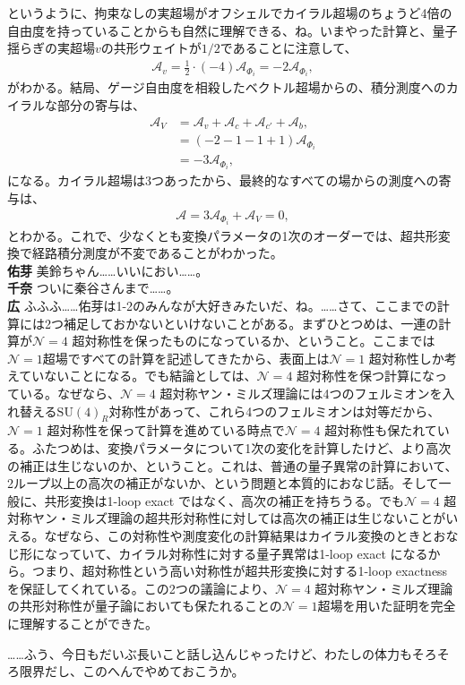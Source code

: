 \documentclass[paper=b5j,fontsize=12Q,jafontsize=12Q,baselineskip=21Q]{jlreq}
\DeclareRobustCommand{\hiron}{\textbf{広 }}
\DeclareRobustCommand{\chinan}{\textbf{千奈 }}
\DeclareRobustCommand{\umen}{\textbf{佑芽 }}
\begin{document}
\begin{refsection}
\begin{itemize}
\end{itemize}
というように、拘束なしの実超場がオフシェルでカイラル超場のちょうど4倍の自由度を持っていることからも自然に理解できる、ね。いまやった計算と、量子揺らぎの実超場$v$の共形ウェイトが$1/2$であることに注意して、
\begin{align}
  \mathcal A_v=\frac12\cdot(-4)\mathcal A_{\Phi_i}=-2\mathcal A_{\Phi_i},
\end{align}
がわかる。結局、ゲージ自由度を相殺したベクトル超場からの、積分測度へのカイラルな部分の寄与は、
\begin{align}
  \mathcal A_V&=\mathcal A_v+\mathcal A_c+\mathcal A_{c'}+\mathcal A_b,\\
  &=(-2-1-1+1)\mathcal A_{\Phi_i}\\
  &=-3\mathcal A_{\Phi_i},
\end{align}
になる。カイラル超場は3つあったから、最終的なすべての場からの測度への寄与は、
\begin{align}
  \mathcal A=3\mathcal A_{\Phi_i}+\mathcal A_V=0,
\end{align}
とわかる。これで、少なくとも変換パラメータの1次のオーダーでは、超共形変換で経路積分測度が不変であることがわかった。
\\\umen 美鈴ちゃん……いいにおい……。
\\\chinan ついに秦谷さんまで……。
\\\hiron ふふふ……佑芽は1-2のみんなが大好きみたいだ、ね。……さて、ここまでの計算には2つ補足しておかないといけないことがある。まずひとつめは、一連の計算が$\mathcal N=4$ 超対称性を保ったものになっているか、ということ。ここまでは$\mathcal N=1$超場ですべての計算を記述してきたから、表面上は$\mathcal N=1$ 超対称性しか考えていないことになる。でも結論としては、$\mathcal N=4$ 超対称性を保つ計算になっている。なぜなら、$\mathcal N=4$ 超対称ヤン・ミルズ理論には4つのフェルミオンを入れ替える$\mathrm{SU}(4)_R$対称性があって、これら4つのフェルミオンは対等だから、$\mathcal N=1$ 超対称性を保って計算を進めている時点で$\mathcal N=4$ 超対称性も保たれている。ふたつめは、変換パラメータについて1次の変化を計算したけど、より高次の補正は生じないのか、ということ。これは、普通の量子異常の計算において、2ループ以上の高次の補正がないか、という問題と本質的におなじ話。そして一般に、共形変換は1-loop exact ではなく、高次の補正を持ちうる。でも$\mathcal N=4$ 超対称ヤン・ミルズ理論の超共形対称性に対しては高次の補正は生じないことがいえる。なぜなら、この対称性や測度変化の計算結果はカイラル変換のときとおなじ形になっていて、カイラル対称性に対する量子異常は1-loop exact になるから。つまり、超対称性という高い対称性が超共形変換に対する1-loop exactness を保証してくれている。この2つの議論により、$\mathcal N=4$ 超対称ヤン・ミルズ理論の共形対称性が量子論においても保たれることの$\mathcal N=1$超場を用いた証明を完全に理解することができた。

……ふう、今日もだいぶ長いこと話し込んじゃったけど、わたしの体力もそろそろ限界だし、このへんでやめておこうか。

\nocite{Ugajin:2025eh, Kallosh:1996uy, Ferrara:1997ci, Marcus:1983hb, Borsten:2008wd, Borsten:2010aa, Cvetic:1995yq, Tateishi:2026ay}
\printbibliography[heading=subbibliography, title={参考文献}]
\end{refsection}
\end{document}
